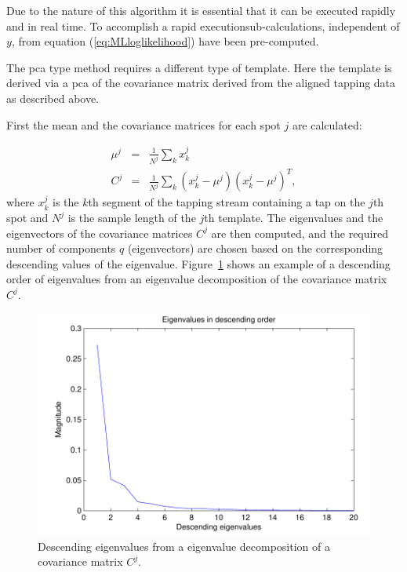 Due to the nature of this algorithm it is essential that it can be executed rapidly and in real time. To accomplish a rapid execution\DIFaddbegin \DIFadd{, }\DIFaddend sub-calculations, independent of $y$, from equation (\ref{eq:MLloglikelihood}) have been pre-computed.

The \DIFdelbegin {}\DIFdelend \DIFaddbegin \gls{pca} \DIFaddend type method requires a different type of template. Here the template is derived via a \DIFdelbegin {}\DIFdelend \DIFaddbegin \gls{pca} \DIFaddend of the covariance matrix derived from the aligned tapping data as described above.

First the mean and the covariance matrices for each spot $j$ are calculated:

\begin{eqnarray}\nonumber
\mu^j &=& \frac{1}{N^j} \sum_k x^j_k \\\label{eq:PCAcovariance}
C^j &=& \frac{1}{N^j}\sum_k \left(x^j_k - \mu^j\right)\left(x^j_k - \mu^j\right)^T,
\end{eqnarray}
where $x^j_k$ is the $k$th segment of the tapping stream containing a tap on the $j$th spot and $N^j$ is the sample length of the $j$th template. The eigenvalues and the eigenvectors of the covariance matrices $C^j$ are then computed, and the required number of components $q$ (eigenvectors) are chosen based on the corresponding descending values of the eigenvalue. Figure~\ref{fig:eigenvalues} shows an example of a descending order of eigenvalues from an eigenvalue decomposition of the covariance matrix $C^j$.

\begin{figure}[!]
\centering
\includegraphics[width=120mm]{eigenvalues.pdf}
\caption{Descending eigenvalues from a eigenvalue decomposition of a covariance matrix $C^j$.}\label{fig:eigenvalues}
\end{figure}


